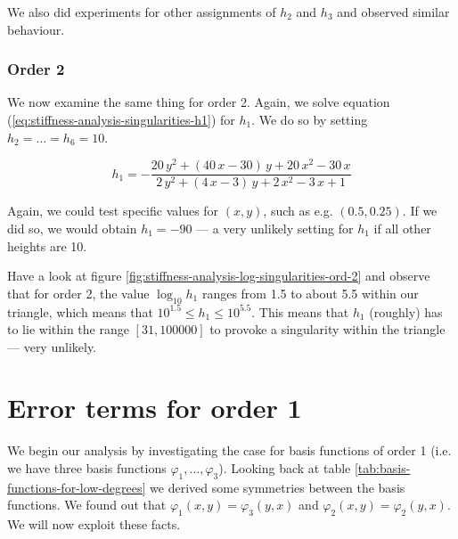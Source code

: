 \documentclass{article}
\renewcommand{\phi}{\varphi}
\begin{document}
We also did experiments for other assignments of $h_2$ and $h_3$ and observed similar behaviour.

\subsubsection{Order 2}
\label{sec:stiffness-analysis-singularities-ord-2}

We now examine the same thing for order 2. Again, we solve equation (\ref{eq:stiffness-analysis-singularities-h1}) for $h_1$. We do so by setting $h_2=\dots=h_6=10$.


\begin{equation*}
  h_1 = -\frac{20\,y^2+\left(40\,x-30\right)\,y+20\,x^2-30\,x}{2\,y^2+
    \left(4\,x-3\right)\,y+2\,x^2-3\,x+1}
\end{equation*}

Again, we could test specific values for $(x,y)$, such as e.g. $(0.5, 0.25)$. If we did so, we would obtain $h_1=-90$ --- a very unlikely setting for $h_1$ if all other heights are 10.

Have a look at figure \ref{fig:stiffness-analysis-log-singularities-ord-2} and observe that for order 2, the value $\log_{10} h_1$ ranges from 1.5 to about 5.5 within our triangle, which means that $10^{1.5} \leq h_1 \leq 10^{5.5}$. This means that $h_1$ (roughly) has to lie within the range $\left[ 31, 100000 \right]$ to provoke a singularity within the triangle --- very unlikely.

\section{Error terms for order 1}
\label{sec:stiffness-analysis-first-touch}

We begin our analysis by investigating the case for basis functions of order 1 (i.e. we have three basis functions $\phi_1,\dots,\phi_3$). Looking back at table \ref{tab:basis-functions-for-low-degrees} we derived some symmetries between the basis functions. We found out that $\phi_1(x,y)=\phi_3(y,x)$ and $\phi_2(x,y)=\phi_2(y,x)$. We will now exploit these facts.
\end{document}
